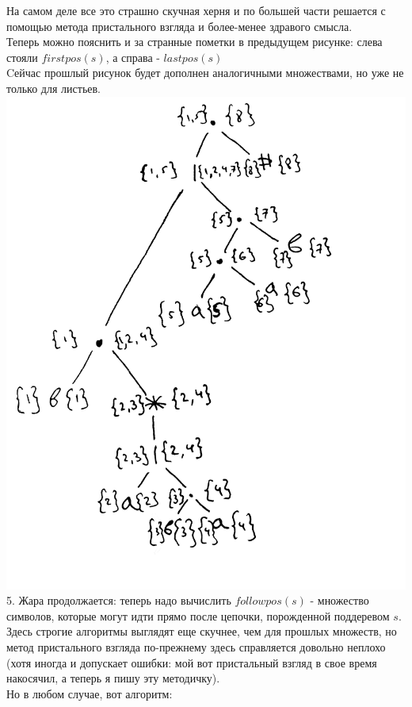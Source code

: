 \documentclass[14pt]{extreport}
\begin{document}
	На самом деле все это страшно скучная херня и по большей части решается с помощью метода
	пристального взгляда и более-менее здравого смысла.\\
	Теперь можно пояснить и за странные пометки в предыдущем рисунке: слева стояли $firstpos(s)$,
	а справа - $lastpos(s)$\\
	Cейчас прошлый рисунок будет дополнен аналогичными множествами, но уже не только для листьев.\\
	\includegraphics[scale=0.14]{data/pic3_2.png}\\
	5. Жара продолжается: теперь надо вычислить $followpos(s)$ - множество символов, которые могут
	идти прямо после цепочки, порожденной поддеревом $s$.\\
	Здесь строгие алгоритмы выглядят еще скучнее, чем для прошлых множеств, но метод пристального
	взгляда по-прежнему здесь справляется довольно неплохо (хотя иногда и допускает ошибки: мой
	вот пристальный взгляд в свое время накосячил, а теперь я пишу эту методичку).\\
	Но в любом случае, вот алгоритм:\\
\end{document}
